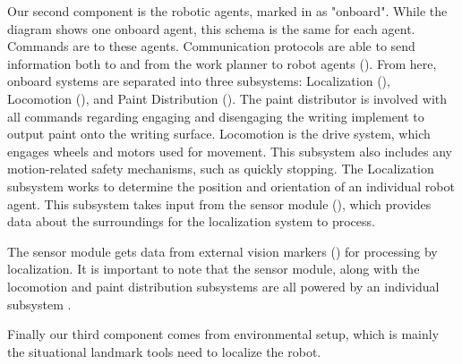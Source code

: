 Our second component is the robotic agents, marked in  as "onboard". While the diagram shows one onboard agent, this schema is the same for each agent. Commands are  to these agents.  Communication protocols are able to send information both to and from the work planner to robot agents (). From here, onboard systems are separated into three subsystems: Localization (), Locomotion (), and Paint Distribution (). The paint distributor is involved with all commands regarding engaging and disengaging the writing implement to output paint onto the writing surface. Locomotion is the drive system, which engages wheels and motors used for movement. This subsystem also includes any motion-related safety mechanisms, such as quickly stopping. The Localization subsystem works to determine the position and orientation of an individual robot agent. This subsystem takes input from the sensor module (), which provides data about the surroundings for the localization system to process.

The sensor module gets data from external vision markers () for processing by localization. It is important to note that the sensor module, along with the locomotion and paint distribution subsystems are all powered by an individual subsystem .

Finally our third component comes from environmental setup, which is mainly the situational landmark tools need to localize the robot.  